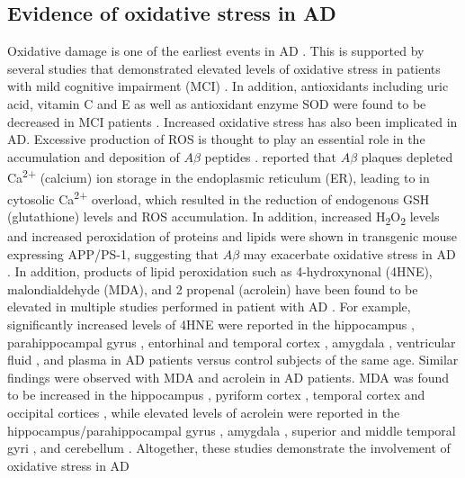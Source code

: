 \subsection{Evidence of oxidative stress in AD}
Oxidative damage is one of the earliest events in AD \citep{Nunomura2001}. This is supported by several studies that demonstrated elevated levels of oxidative stress in patients with mild cognitive impairment (MCI) \citep{Ansari2010,Pratico2004,Williams2006}. In addition, antioxidants including uric acid, vitamin C and E as well as antioxidant enzyme SOD were found to be decreased in MCI patients \citep{Rinaldi2003,Torres2011}. Increased oxidative stress has also been implicated in AD. Excessive production of ROS is thought to play an essential role in the accumulation and deposition of $A\beta$ peptides \citep{Bonda2010}. \citet{Ferreiro2008} reported that $A\beta$ plaques depleted Ca\textsuperscript{2+}  (calcium) ion storage in the endoplasmic reticulum (ER), leading to in cytosolic Ca\textsuperscript{2+} overload, which resulted in the reduction of endogenous GSH (glutathione) levels and ROS accumulation. In addition, increased H\textsubscript{2}O\textsubscript{2} levels and increased peroxidation of proteins and lipids were shown in transgenic mouse expressing APP/PS-1, suggesting that $A\beta$ may exacerbate oxidative stress in AD \citep{Matsuoka2001,Zhao2013}. In addition, products of lipid peroxidation such as 4-hydroxynonal (4HNE), malondialdehyde (MDA), and 2 propenal (acrolein) have been found to be elevated in multiple studies performed in patient with AD \citep{Wang2014,Zhao2013}. For example, significantly increased levels of 4HNE were reported in the hippocampus \citep{Lovell1995,Markesbery1998,Montine1998}, parahippocampal gyrus \citep{Markesbery1998}, entorhinal and temporal cortex \citep{Montine1998}, amygdala \citep{Lovell1995,Markesbery1998}, ventricular fluid \citep{Lovell1997}, and plasma \citep{McGrath2001} in AD patients versus control subjects of the same age. Similar findings were observed with MDA and acrolein in AD patients. MDA was found to be increased in the hippocampus \citep{Lovell1995}, pyriform cortex \citep{Lovell1995}, temporal cortex \citep{Marcus1998,Palmer1994} and occipital cortices \citep{Miranda2000}, while elevated levels of acrolein were reported in the hippocampus/parahippocampal gyrus \citep{Bradley2010,Calingasan1999,Lovell2001,Williams2006}, amygdala \citep{Lovell2001}, superior and middle temporal gyri \citep{Bradley2010,Williams2006}, and cerebellum \citep{Bradley2010,Williams2006}. Altogether, these studies demonstrate the involvement of oxidative stress in AD

